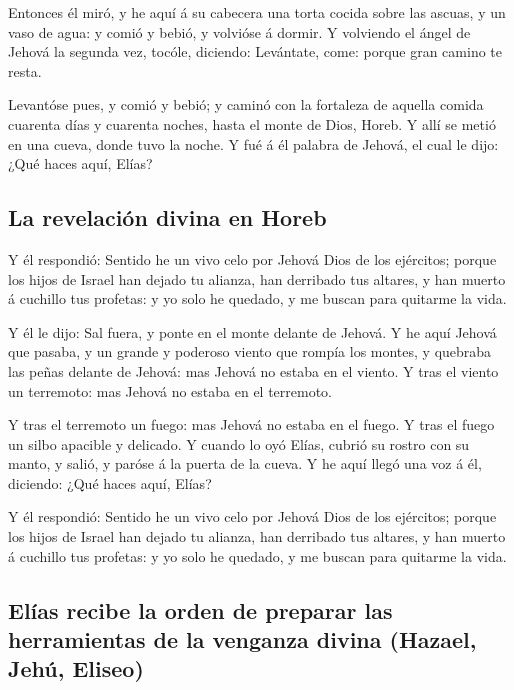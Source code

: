  Entonces él miró, y he aquí á su cabecera una torta cocida
sobre las ascuas, y un vaso de agua: y comió y bebió, y volvióse á
dormir.  Y volviendo el ángel de Jehová la segunda vez,
tocóle, diciendo: Levántate, come: porque gran camino te resta.

 Levantóse pues, y comió y bebió; y caminó con la fortaleza
de aquella comida cuarenta días y cuarenta noches, hasta el monte de
Dios, Horeb.  Y allí se metió en una cueva, donde tuvo la
noche. Y fué á él palabra de Jehová, el cual le dijo: ¿Qué haces aquí,
Elías?

\hypertarget{la-revelaciuxf3n-divina-en-horeb}{%
\subsection{La revelación divina en
Horeb}\label{la-revelaciuxf3n-divina-en-horeb}}

 Y él respondió: Sentido he un vivo celo por Jehová Dios de
los ejércitos; porque los hijos de Israel han dejado tu alianza, han
derribado tus altares, y han muerto á cuchillo tus profetas: y yo solo
he quedado, y me buscan para quitarme la vida.

 Y él le dijo: Sal fuera, y ponte en el monte delante de
Jehová. Y he aquí Jehová que pasaba, y un grande y poderoso viento que
rompía los montes, y quebraba las peñas delante de Jehová: mas Jehová no
estaba en el viento. Y tras el viento un terremoto: mas Jehová no estaba
en el terremoto.

 Y tras el terremoto un fuego: mas Jehová no estaba en el
fuego. Y tras el fuego un silbo apacible y delicado.  Y
cuando lo oyó Elías, cubrió su rostro con su manto, y salió, y paróse á
la puerta de la cueva. Y he aquí llegó una voz á él, diciendo: ¿Qué
haces aquí, Elías?

 Y él respondió: Sentido he un vivo celo por Jehová Dios de
los ejércitos; porque los hijos de Israel han dejado tu alianza, han
derribado tus altares, y han muerto á cuchillo tus profetas: y yo solo
he quedado, y me buscan para quitarme la vida.

\hypertarget{eluxedas-recibe-la-orden-de-preparar-las-herramientas-de-la-venganza-divina-hazael-jehuxfa-eliseo}{%
\subsection{Elías recibe la orden de preparar las herramientas de la
venganza divina (Hazael, Jehú,
Eliseo)}\label{eluxedas-recibe-la-orden-de-preparar-las-herramientas-de-la-venganza-divina-hazael-jehuxfa-eliseo}}

